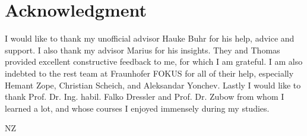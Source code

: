 
\cleardoublepage
{}
\section*{Acknowledgment}

I would like to thank my unofficial advisor Hauke Buhr for his help, advice and support. I also thank my advisor Marius for his insights. They and Thomas provided excellent constructive feedback to me, for which I am grateful. I am also indebted to the rest team at Fraunhofer FOKUS for all of their help, especially Hemant Zope, Christian Scheich, and Aleksandar Yonchev. Lastly I would like to thank Prof. Dr. Ing. habil. Falko Dressler and Prof. Dr. Zubow from whom I learned a lot, and whose courses I enjoyed immensely during my studies.

\begin{flushright}
NZ\\[1pc]
\end{flushright}
